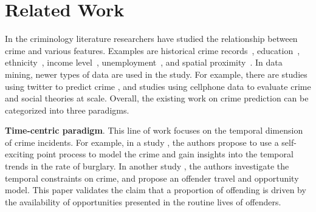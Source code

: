 

\section{Related Work}
\label{sec:related-work}


In the criminology literature researchers have studied the relationship between crime and various features. Examples are historical crime records~\cite{MSBS+12,WRWS13}, education~\cite{Ehrl75}, ethnicity~\cite{Brai89}, income level~\cite{Patt91}, unemployment~\cite{Free99}, and spatial proximity~\cite{Ans02}. 
In data mining, newer types of data are used in the study. For example, there are studies using twitter to predict crime \cite{WGB12,Gerb14}, and studies using cellphone data \cite{TQC14,Bogo14} to evaluate crime and social theories at scale. 
Overall, the existing work on crime prediction can be categorized into three paradigms.


\vspace{1mm}
\textbf{Time-centric paradigm}. This line of work focuses on the temporal dimension of crime incidents. For example, in a study \cite{MSBS+12}, the authors propose to use a self-exciting point process to model the crime and gain insights into the temporal trends in the rate of burglary. In another study \cite{Ratc06}, the authors investigate the temporal constraints on crime, and propose an offender travel and opportunity model. This paper validates the claim that a proportion of offending is driven by the availability of opportunities presented in the  routine lives of offenders. 



